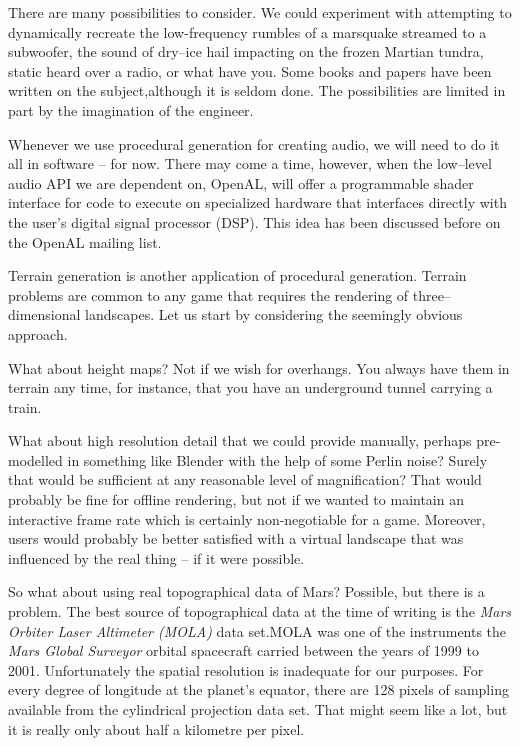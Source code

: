 There are many possibilities to consider. We could experiment with attempting to dynamically recreate the low-frequency rumbles of a marsquake streamed to a subwoofer, the sound of dry--ice hail impacting on the frozen Martian tundra, static heard over a radio, or what have you. Some books and papers have been written on the subject, although it is seldom done. The possibilities are limited in part by the imagination of the engineer.

Whenever we use procedural generation for creating audio, we will need to do it all in software -- for now. There may come a time, however, when the low--level audio API we are dependent on, OpenAL, will offer a programmable shader interface for code to execute on specialized hardware that interfaces directly with the user's digital signal processor (DSP). This idea has been discussed before on the OpenAL mailing list.

Terrain generation is another application of procedural generation. Terrain problems are common to any game that requires the rendering of three--dimensional landscapes. Let us start by considering the seemingly obvious approach.

What about height maps? Not if we wish for overhangs. You always have them in terrain any time, for instance, that you have an underground tunnel carrying a train.

What about high resolution detail that we could provide manually, perhaps pre-modelled in something like Blender with the help of some Perlin noise? Surely that would be sufficient at any reasonable level of magnification? That would probably be fine for offline rendering, but not if we wanted to maintain an interactive frame rate which is certainly non-negotiable for a game. Moreover, users would probably be better satisfied with a virtual landscape that was influenced by the real thing -- if it were possible.

So what about using real topographical data of Mars? Possible, but there is a problem. The best source of topographical data at the time of writing is the {\it Mars Orbiter Laser Altimeter (MOLA)} data set.\footnotecite[mola] MOLA was one of the instruments the {\it Mars Global Surveyor} orbital spacecraft carried between the years of 1999 to 2001. Unfortunately the spatial resolution is inadequate for our purposes. For every degree of longitude at the planet's equator, there are 128 pixels of sampling available from the cylindrical projection data set. That might seem like a lot, but it is really only about half a kilometre per pixel.

